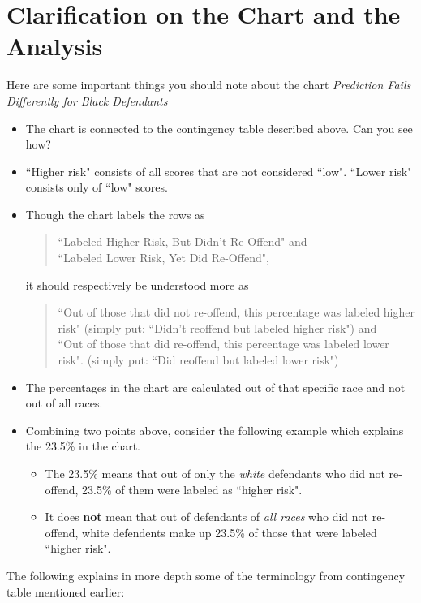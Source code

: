 \documentclass[12pt]{article}
\begin{document}
\section{Clarification on the Chart and the Analysis}
Here are some important things you should note about the chart \textit{Prediction Fails Differently for Black Defendants}
\begin{itemize}
\item The chart is connected to the contingency table described above. Can you see how?
\item ``Higher risk" consists of all scores that are not considered ``low". ``Lower risk" consists only of ``low" scores.

\pagebreak

\item Though the chart labels the rows as
	\begin{quote}
	``Labeled Higher Risk, But Didn't Re-Offend" and \\
	``Labeled Lower Risk, Yet Did Re-Offend",
	\end{quote}
	it should respectively be understood more as 
	\begin{quote}
	``Out of those that did not re-offend, this percentage was labeled higher risk" (simply put: ``Didn't reoffend but labeled higher risk") and  \\
	``Out of those that did re-offend, this percentage was labeled lower risk". (simply put: ``Did reoffend but labeled lower risk")
	\end{quote}
\item The percentages in the chart are calculated out of that specific race and not out of all races.
\item Combining two points above, consider the following example which explains the 23.5\% in the chart.
	\begin{itemize}
	\item The 23.5\% means that out of only the \textit{white} defendants who did not re-offend, 23.5\% of them were labeled as ``higher risk".
	\item It does \textbf{not} mean that out of defendants of \textit{all races} who did not re-offend, white defendents make up 23.5\% of those that were labeled ``higher risk".
	\end{itemize}
\end{itemize}
The following explains in more depth some of the terminology from contingency table mentioned earlier:
\end{document}
